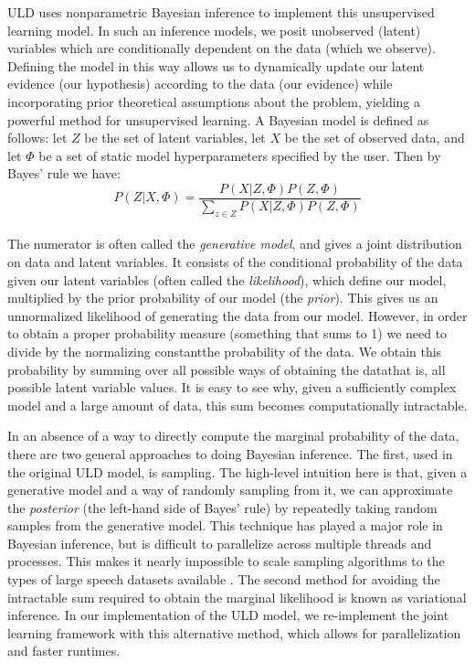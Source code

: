 \documentclass[12pt,letterpaper]{article}
\begin{document}
ULD uses nonparametric Bayesian inference to implement this unsupervised learning model. In such an inference models, we posit unobserved (latent) variables which are conditionally dependent on the data (which we observe). Defining the model in this way allows us to dynamically update our latent evidence (our hypothesis) according to the data (our evidence) while incorporating prior theoretical assumptions about the problem, yielding a powerful method for unsupervised learning. 
A Bayesian model is defined as follows: let $Z$ be the set of latent variables, let $X$ be the set of observed data, and let $\Phi$ be a set of static model hyperparameters specified by the user. Then by Bayes' rule we have: $$P(Z|X, \Phi) = \frac{P(X|Z, \Phi)P(Z, \Phi)}{\sum\limits_{ z \in Z} P(X|Z, \Phi)P(Z, \Phi)}$$\\ The numerator is often called the \textit{generative model}, and gives a joint distribution on data and latent variables. It consists of the conditional probability of the data given our latent variables (often called the \textit{likelihood}), which define our model, multiplied by the prior probability of our model (the \textit{prior}). This gives us an unnormalized likelihood of generating the data from our model. However, in order to obtain a proper probability measure (something that sums to 1) we need to divide by the normalizing constant\textemdash the probability of the data. We obtain this probability by summing over all possible ways of obtaining the data\textemdash that is, all possible latent variable values. It is easy to see why, given a sufficiently complex model and a large amount of data, this sum becomes computationally intractable. 

In an absence of a way to directly compute the marginal probability of the data, there are two general approaches to doing Bayesian inference. The first, used in the original ULD model, is sampling. The high-level intuition here is that, given a generative model and a way of randomly sampling from it, we can approximate the \textit{posterior} (the left-hand side of Bayes' rule) by repeatedly taking random samples from the generative model. This technique has played a major role in Bayesian inference, but is difficult to parallelize across multiple threads and processes. This makes it nearly impossible to scale sampling algorithms to the types of large speech datasets available \citep{blei:2017}. The second method for avoiding the intractable sum required to obtain the marginal likelihood is known as variational inference. In our implementation of the ULD model, we re-implement the joint learning framework with this alternative method, which allows for parallelization and faster runtimes. 
\end{document}
